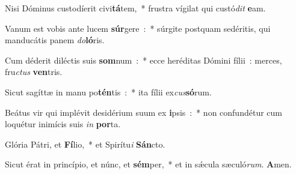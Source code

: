 ﻿\item Nisi Dóminus custodíerit civi\textbf{tá}tem,~* frustra vígilat qui custó\emph{dit} \textbf{e}am.
\item Vanum est vobis ante lucem \textbf{súr}gere~:~* súrgite postquam sedéritis, qui manducátis panem \emph{do}\textbf{ló}ris.
\item Cum déderit diléctis suis \textbf{som}num~:~* ecce heréditas Dómini fílii~: merces, fru\emph{ctus} \textbf{ven}tris.
\item Sicut sagíttæ in manu po\textbf{tén}tis~:~* ita fílii ex\emph{cus}\textbf{só}rum.
\item Beátus vir qui implévit desidérium suum ex \textbf{i}psis~:~* non confundétur cum loquétur inimícis suis \emph{in} \textbf{por}ta.
\item Glória Pátri, et \textbf{Fí}lio,~* et Spirítu\emph{i} \textbf{Sán}cto.
\item Sicut érat in princípio, et núnc, et \textbf{sém}per,~* et in sǽcula sæculó\emph{rum}. \textbf{A}men.
